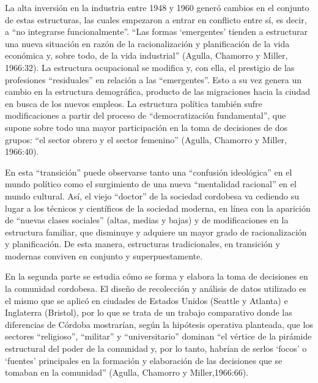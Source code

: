 La alta inversión en la industria entre 1948 y 1960 generó cambios en el conjunto de estas estructuras, las cuales empezaron a entrar en conflicto entre sí, es decir, a ``no integrarse funcionalmente''. ``Las formas `emergentes' tienden a estructurar una nueva situación en razón de la racionalización y planificación de la vida económica y, sobre todo, de la vida industrial'' (Agulla, Chamorro y Miller, 1966:32). La estructura ocupacional se modifica y, con ella, el prestigio de las profesiones ``residuales'' en relación a las ``emergentes''. Esto a su vez genera un cambio en la estructura demográfica, producto de las migraciones hacia la ciudad en busca de los nuevos empleos. La estructura política también sufre modificaciones a partir del proceso de ``democratización fundamental'', que supone sobre todo una mayor participación en la toma de decisiones de dos grupos: ``el sector obrero y el sector femenino'' (Agulla, Chamorro y Miller, 1966:40).

En esta ``transición'' puede observarse tanto una ``confusión ideológica'' en el mundo político como el surgimiento de una nueva ``mentalidad racional'' en el mundo cultural. Así, el viejo ``doctor'' de la sociedad cordobesa va cediendo su lugar a los técnicos y científicos de la sociedad moderna, en línea con la aparición de ``nuevas clases sociales'' (altas, medias y bajas) y de modificaciones en la estructura familiar, que disminuye y adquiere un mayor grado de racionalización y planificación. De esta manera, estructuras tradicionales, en transición y modernas conviven en conjunto y superpuestamente.

En la segunda parte se estudia cómo se forma y elabora la toma de decisiones en la comunidad cordobesa. El diseño de recolección y análisis de datos utilizado es el mismo que se aplicó en ciudades de Estados Unidos (Seattle y Atlanta) e Inglaterra (Bristol), por lo que se trata de un trabajo comparativo donde las diferencias de Córdoba mostrarían, según la hipótesis operativa planteada, que los sectores ``religioso'', ``militar'' y ``universitario'' dominan ``el vértice de la pirámide estructural del poder de la comunidad y, por lo tanto, habrían de serlos `focos' o `fuentes' principales en la formación y elaboración de las decisiones que se tomaban en la comunidad'' (Agulla, Chamorro y Miller,1966:66).

